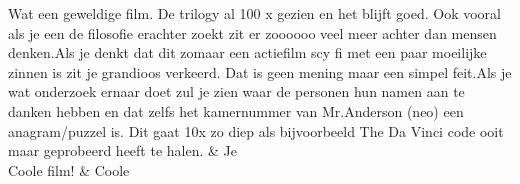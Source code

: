 \begin{table}
\begin{tabu}
Wat een geweldige film. De trilogy al 100 x gezien en het blijft goed. Ook vooral als je een de filosofie erachter zoekt zit er zoooooo veel meer achter dan mensen denken.Als je denkt dat dit zomaar een actiefilm scy fi met een paar moeilijke zinnen is zit je grandioos verkeerd. Dat is geen mening maar een simpel feit.Als je wat onderzoek ernaar doet zul je zien waar de personen hun namen aan te danken hebben en dat zelfs het kamernummer van Mr.Anderson (neo) een anagram/puzzel is. Dit gaat 10x zo diep als bijvoorbeeld The Da Vinci code ooit maar geprobeerd heeft te halen.                                                                                                                                                                                                                                                                                                                                                                                                                                                                                                                                                                                                                                                                                                                                                                                                                                                                                             & Je                                   \\ \hline
Coole film!                                                                                                                                                                                                                                                                                                                                                                                                                                                                                                                                                                                                                                                                                                                                                                                                                                                                                                                                                                                                                                                                                                                                                                                                                                                                                                                                                                                                                                                                                     & Coole                                \\ \hline

\end{tabu}
\end{table}
